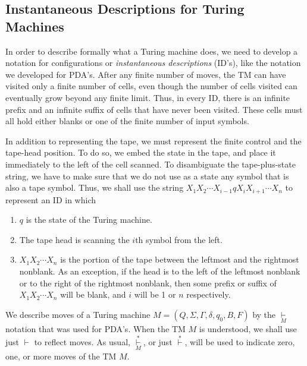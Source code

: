 \documentclass[]{article}
\begin{document}
\subsection*{Instantaneous Descriptions for Turing Machines}
In order to describe formally what a Turing machine does, we need to 
develop a notation for configurations or \emph{instantaneous descriptions} 
(ID's), like the notation we developed for PDA's. After any finite number 
of moves, the TM can have visited only a finite number of cells, even 
though the number of cells visited can eventually grow beyond any finite 
limit. Thus, in every ID, there is an infinite prefix and an infinite 
suffix of cells that have never been visited. These cells must all hold 
either blanks or one of the finite number of input symbols.

In addition to representing the tape, we must represent the finite control 
and the tape-head position. To do so, we embed the state in the tape, and 
place it immediately to the left of the cell scanned. To disambiguate the 
tape-plus-state string, we have to make sure that we do not use as a state 
any symbol that is also a tape symbol. Thus, we shall use the string 
$X_1X_2\cdots{}X_{i-1}qX_iX_{i+1}\cdots{}X_n$ to represent an ID in which
\begin{enumerate}
\item $q$ is the state of the Turing machine.
\item The tape head is scanning the $i$th symbol from the left.
\item $X_1X_2\cdots{}X_n$ is the portion of the tape between the 
leftmost and the rightmost nonblank. As an exception, if the head is to 
the left of the leftmost nonblank or to the right of the rightmost 
nonblank, then some prefix or suffix of $X_1X_2\cdots{}X_n$ will be 
blank, and $i$ will be 1 or $n$ respectively.
\end{enumerate}

We describe moves of a Turing machine 
$M = (Q,\Sigma,\Gamma,\delta,q_0,B,F)$ by the $\underset{M}{\vdash}$ 
notation that was used for PDA's. When the TM $M$ is understood, we shall 
use just $\vdash$ to reflect moves. As usual, 
$\overset{*}{\underset{M}{\vdash}}$, or just $\overset{*}{\vdash}$, will be
used to indicate zero, one, or more moves of the TM $M$.
\end{document}
